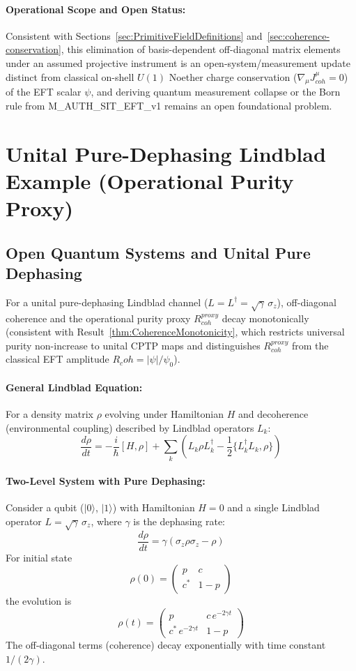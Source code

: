 \documentclass[american,11pt,letterpaper]{article}
\newcommand{\Rcoh}{R_{\mathrm{coh}}}
\def\mathrm#1{#1}%
\def\texttt#1{#1}%
\def\emph#1{#1}%
\def\Rcoh{R_coh}%
\begin{document}
\paragraph{Operational Scope and Open Status:}
Consistent with Sections~\ref{sec:PrimitiveFieldDefinitions} and~\ref{sec:coherence-conservation}, this elimination of basis-dependent off-diagonal matrix elements under an assumed projective instrument is an open-system/measurement update distinct from classical on-shell $U(1)$ Noether charge conservation ($\nabla_\mu J^\mu_{\mathrm{coh}} = 0$) of the EFT scalar $\psi$, and deriving quantum measurement collapse or the Born rule from \texttt{M\_AUTH\_SIT\_EFT\_v1} remains an open foundational problem.

\section{Unital Pure-Dephasing Lindblad Example (Operational Purity Proxy)}
\label{sec:DecoherenceLindblad}

\subsection{Open Quantum Systems and Unital Pure Dephasing}

For a \emph{unital} pure-dephasing Lindblad channel ($L = L^\dagger = \sqrt{\gamma}\,\sigma_z$), off-diagonal coherence and the operational purity proxy $R_{\mathrm{coh}}^{\mathrm{proxy}}$ decay monotonically (consistent with Result~\ref{thm:CoherenceMonotonicity}, which restricts universal purity non-increase to unital CPTP maps and distinguishes $R_{\mathrm{coh}}^{\mathrm{proxy}}$ from the classical EFT amplitude $\Rcoh = |\psi|/\psi_0$).

\paragraph{General Lindblad Equation:}
For a density matrix $\rho$ evolving under Hamiltonian $H$ and decoherence (environmental coupling) described by Lindblad operators $L_k$:
\[
\frac{d\rho}{dt} = -\frac{i}{\hbar}[H, \rho] + \sum_k \left( L_k \rho L_k^\dagger - \frac{1}{2}\{L_k^\dagger L_k, \rho\} \right)
\]

\paragraph{Two-Level System with Pure Dephasing:}
Consider a qubit ($|0\rangle$, $|1\rangle$) with Hamiltonian $H=0$ and a single Lindblad operator $L = \sqrt{\gamma}\, \sigma_z$, where $\gamma$ is the dephasing rate:
\[
\frac{d\rho}{dt} = \gamma \left( \sigma_z \rho \sigma_z - \rho \right)
\]
For initial state
\[
\rho(0) = \begin{pmatrix} p & c \\ c^* & 1-p \end{pmatrix}
\]
the evolution is
\[
\rho(t) = \begin{pmatrix} p & c\, e^{-2\gamma t} \\ c^*\, e^{-2\gamma t} & 1-p \end{pmatrix}
\]
The off-diagonal terms (coherence) decay exponentially with time constant $1/(2\gamma)$.
\end{document}
